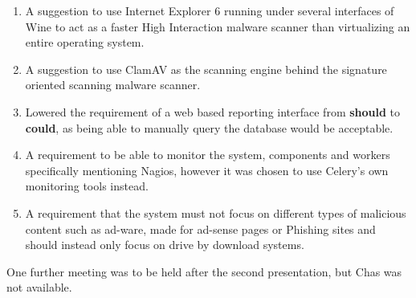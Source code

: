 \begin{enumerate} 
    \item A suggestion to use Internet Explorer 6 running under
            several interfaces of Wine to act as a faster High Interaction
            malware scanner than virtualizing an entire operating system.

    \item A suggestion to use ClamAV as the scanning engine behind the signature
        oriented scanning malware scanner.

    \item Lowered the requirement of a web based reporting interface from
        \textbf{should} to \textbf{could}, as being able to manually query the
        database would be acceptable.

    \item A requirement to be able to monitor the system, components and workers
        specifically mentioning Nagios, however it was chosen to use Celery's
        own monitoring tools instead.

    \item A requirement that the system must not focus on different types of
        malicious content such as ad-ware, made for ad-sense pages or Phishing
        sites and should instead only focus on drive by download systems.
\end{enumerate}

One further meeting was to be held after the second presentation, but Chas was
not available.

